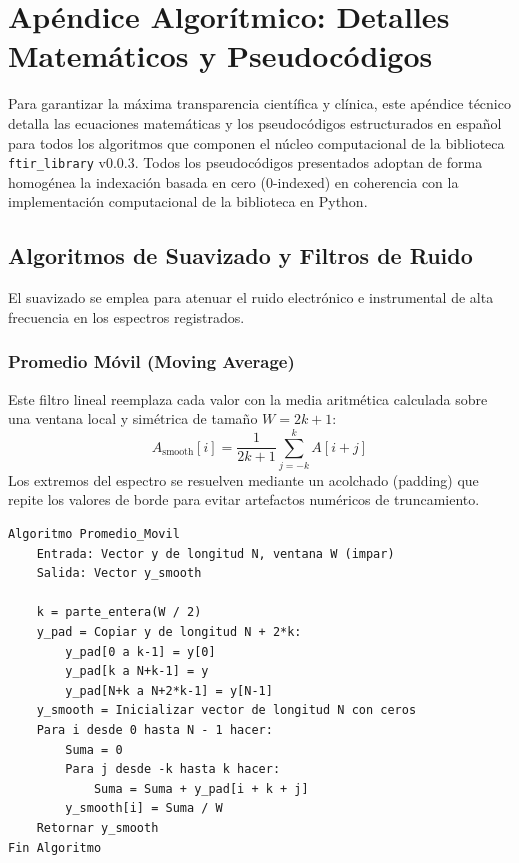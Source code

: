 \section{Apéndice Algorítmico: Detalles Matemáticos y Pseudocódigos}
Para garantizar la máxima transparencia científica y clínica, este apéndice técnico detalla las ecuaciones matemáticas y los pseudocódigos estructurados en español para todos los algoritmos que componen el núcleo computacional de la biblioteca \texttt{ftir\_library} v0.0.3. Todos los pseudocódigos presentados adoptan de forma homogénea la indexación basada en cero (0-indexed) en coherencia con la implementación computacional de la biblioteca en Python.

\subsection{Algoritmos de Suavizado y Filtros de Ruido}
El suavizado se emplea para atenuar el ruido electrónico e instrumental de alta frecuencia en los espectros registrados.

\subsubsection{Promedio Móvil (Moving Average)}
Este filtro lineal reemplaza cada valor con la media aritmética calculada sobre una ventana local y simétrica de tamaño $W = 2k + 1$:
\begin{equation}
    A_{\text{smooth}}[i] = \frac{1}{2k + 1} \sum_{j=-k}^{k} A[i + j]
\end{equation}
Los extremos del espectro se resuelven mediante un acolchado (padding) que repite los valores de borde para evitar artefactos numéricos de truncamiento.

\begin{lstlisting}[caption=Algoritmo de Promedio Móvil]
Algoritmo Promedio_Movil
    Entrada: Vector y de longitud N, ventana W (impar)
    Salida: Vector y_smooth

    k = parte_entera(W / 2)
    y_pad = Copiar y de longitud N + 2*k:
        y_pad[0 a k-1] = y[0]
        y_pad[k a N+k-1] = y
        y_pad[N+k a N+2*k-1] = y[N-1]
    y_smooth = Inicializar vector de longitud N con ceros
    Para i desde 0 hasta N - 1 hacer:
        Suma = 0
        Para j desde -k hasta k hacer:
            Suma = Suma + y_pad[i + k + j]
        y_smooth[i] = Suma / W
    Retornar y_smooth
Fin Algoritmo
\end{lstlisting}


